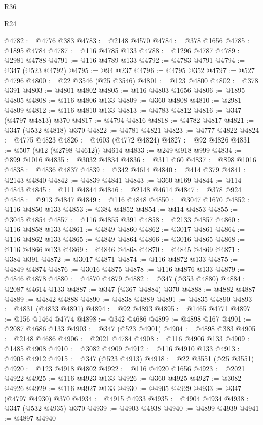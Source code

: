 \begin{lexlean}{R36}
\begin{lexlean}{R24}
\begin{coremodule}
{{{{{{{{{{{{{{{{{{{{{{{{{{{{{{{{{{{{{{{{{{{{{{{{{{{{{{{{{{{{{{{{{{{{{{{{{{{{{{{{{{{{{{{{{{{{{{{{{{{{{{{{{{{{{{{{{{{{{{{{{{{{{{{{{{{{{{{{{{{{{{{{{{{{{{{{{{{{{{{{{{{{{{{{{{{{{{{{{{{{{{{{{{{{{{{{{{{@4782 := @4776 @383
@4783 := @2148 @4570
@4784 := @378 @1656
@4785 := @1895 @4784
@4787 := @116 @4785 @133
@4788 := @1296 @4787
@4789 := @2981 @4788
@4791 := @116 @4789 @133
@4792 := @4783 @4791
@4794 := @347 (@523 @4792)
@4795 := @94 @237
@4796 := @4795 @352
@4797 := @527 @4796
@4800 := @22 @3546 (@25 @3546)
@4801 := @123 @4800
@4802 := @378 @391
@4803 := @4801 @4802
@4805 := @116 @4803 @1656
@4806 := @1895 @4805
@4808 := @116 @4806 @133
@4809 := @360 @4808
@4810 := @2981 @4809
@4812 := @116 @4810 @133
@4813 := @4783 @4812
@4816 := @347 (@4797 @4813) @370
@4817 := @4794 @4816
@4818 := @4782 @4817
@4821 := @347 (@532 @4818) @370
@4822 := @4781 @4821
@4823 := @4777 @4822
@4824 := @4775 @4823
@4826 := @4603 (@4772 @4824)
@4827 := @92 @4826
@4831 := @507 (@12 (@2798 @4612)) @4614
@4833 := @249 @918 @999
@4834 := @899 @1016
@4835 := @3032 @4834
@4836 := @311 @60
@4837 := @898 @1016
@4838 := @4836 @4837
@4839 := @342 @4614
@4840 := @414 @379
@4841 := @2143 @4840
@4842 := @4839 @4841
@4843 := @360 @169
@4844 := @114 @4843
@4845 := @111 @4844
@4846 := @2148 @4614
@4847 := @378 @924
@4848 := @913 @4847
@4849 := @116 @4848
@4850 := @3047 @1670
@4852 := @116 @4850 @133
@4853 := @384 @4852
@4854 := @414 @4853
@4855 := @3045 @4854
@4857 := @116 @4855 @391
@4858 := @2133 @4857
@4860 := @116 @4858 @133
@4861 := @4849 @4860
@4862 := @3017 @4861
@4864 := @116 @4862 @133
@4865 := @4849 @4864
@4866 := @3016 @4865
@4868 := @116 @4866 @133
@4869 := @4846 @4868
@4870 := @4845 @4869
@4871 := @384 @391
@4872 := @3017 @4871
@4874 := @116 @4872 @133
@4875 := @4849 @4874
@4876 := @3016 @4875
@4878 := @116 @4876 @133
@4879 := @4846 @4878
@4880 := @4870 @4879
@4882 := @347 (@353 @4880)
@4884 := @2087 @4614 @133
@4887 := @347 (@367 @4884) @370
@4888 := @4882 @4887
@4889 := @4842 @4888
@4890 := @4838 @4889
@4891 := @4835 @4890
@4893 := @4831 (@4833 @4891)
@4894 := @92 @4893
@4895 := @1465 @4771
@4897 := @156 @1464 @4774
@4898 := @342 @4686
@4899 := @4898 @167
@4901 := @2087 @4686 @133
@4903 := @347 (@523 @4901)
@4904 := @4898 @383
@4905 := @2148 @4686
@4906 := @2021 @4784
@4908 := @116 @4906 @133
@4909 := @1485 @4908
@4910 := @3082 @4909
@4912 := @116 @4910 @133
@4913 := @4905 @4912
@4915 := @347 (@523 @4913)
@4918 := @22 @3551 (@25 @3551)
@4920 := @123 @4918 @4802
@4922 := @116 @4920 @1656
@4923 := @2021 @4922
@4925 := @116 @4923 @133
@4926 := @360 @4925
@4927 := @3082 @4926
@4929 := @116 @4927 @133
@4930 := @4905 @4929
@4933 := @347 (@4797 @4930) @370
@4934 := @4915 @4933
@4935 := @4904 @4934
@4938 := @347 (@532 @4935) @370
@4939 := @4903 @4938
@4940 := @4899 @4939
@4941 := @4897 @4940
}}}}}}}}}}}}}}}}}}}}}}}}}}}}}}}}}}}}}}}}}}}}}}}}}}}}}}}}}}}}}}}}}}}}}}}}}}}}}}}}}}}}}}}}}}}}}}}}}}}}}}}}}}}}}}}}}}}}}}}}}}}}}}}}}}}}}}}}}}}}}}}}}}}}}}}}}}}}}}}}}}}}}}}}}}}}}}}}}}}}}}}}}}}}}}}}}}}
\end{coremodule}
\end{lexlean}
\end{lexlean}
